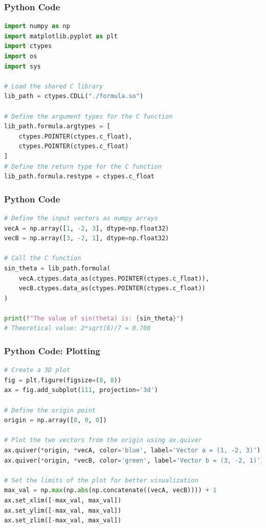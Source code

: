 \documentclass{beamer}
\begin{document}
\begin{frame}[fragile]
    \frametitle{Python Code}
    \begin{lstlisting}[language=Python]
import numpy as np
import matplotlib.pyplot as plt
import ctypes
import os
import sys

# Load the shared C library
lib_path = ctypes.CDLL("./formula.so")

# Define the argument types for the C function
lib_path.formula.argtypes = [
    ctypes.POINTER(ctypes.c_float),
    ctypes.POINTER(ctypes.c_float)
]
# Define the return type for the C function
lib_path.formula.restype = ctypes.c_float
    \end{lstlisting}
\end{frame}

\begin{frame}[fragile]
    \frametitle{Python Code}
    \begin{lstlisting}[language=Python]
# Define the input vectors as numpy arrays
vecA = np.array([1, -2, 3], dtype=np.float32)
vecB = np.array([3, -2, 1], dtype=np.float32)

# Call the C function
sin_theta = lib_path.formula(
    vecA.ctypes.data_as(ctypes.POINTER(ctypes.c_float)),
    vecB.ctypes.data_as(ctypes.POINTER(ctypes.c_float))
)

print(f"The value of sin(theta) is: {sin_theta}")
# Theoretical value: 2*sqrt(6)/7 = 0.700
    \end{lstlisting}
\end{frame}

\begin{frame}[fragile]
    \frametitle{Python Code: Plotting}
    \begin{lstlisting}[language=Python]
# Create a 3D plot
fig = plt.figure(figsize=(8, 8))
ax = fig.add_subplot(111, projection='3d')

# Define the origin point
origin = np.array([0, 0, 0])

# Plot the two vectors from the origin using ax.quiver
ax.quiver(*origin, *vecA, color='blue', label='Vector a = (1, -2, 3)')
ax.quiver(*origin, *vecB, color='green', label='Vector b = (3, -2, 1)')

# Set the limits of the plot for better visualization
max_val = np.max(np.abs(np.concatenate((vecA, vecB)))) + 1
ax.set_xlim([-max_val, max_val])
ax.set_ylim([-max_val, max_val])
ax.set_zlim([-max_val, max_val])
    \end{lstlisting}
\end{frame}
\end{document}

